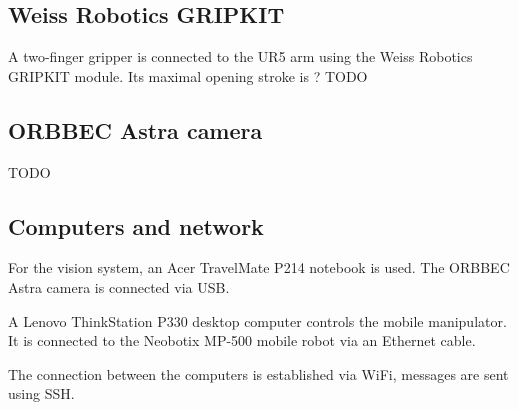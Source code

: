 \subsection{Weiss Robotics GRIPKIT}

A two-finger gripper is connected to the UR5 arm using the Weiss Robotics GRIPKIT module. Its maximal opening stroke is ? TODO \par

\subsection{ORBBEC Astra camera}
TODO \\

\subsection{Computers and network}
For the vision system, an Acer TravelMate P214 notebook is used. The ORBBEC Astra camera is connected via USB.\par
A Lenovo ThinkStation P330 desktop computer controls the mobile manipulator. It is connected to the Neobotix MP-500 mobile robot via an Ethernet cable.\par
The connection between the computers is established via WiFi, messages are sent using SSH.\par
